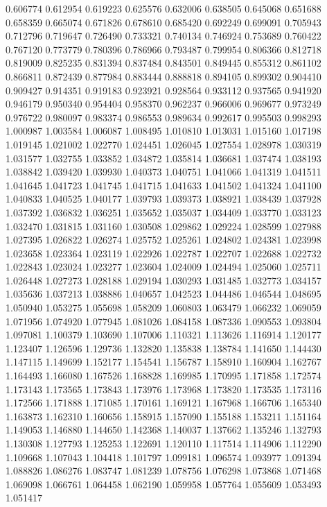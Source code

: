 0.606774
0.612954
0.619223
0.625576
0.632006
0.638505
0.645068
0.651688
0.658359
0.665074
0.671826
0.678610
0.685420
0.692249
0.699091
0.705943
0.712796
0.719647
0.726490
0.733321
0.740134
0.746924
0.753689
0.760422
0.767120
0.773779
0.780396
0.786966
0.793487
0.799954
0.806366
0.812718
0.819009
0.825235
0.831394
0.837484
0.843501
0.849445
0.855312
0.861102
0.866811
0.872439
0.877984
0.883444
0.888818
0.894105
0.899302
0.904410
0.909427
0.914351
0.919183
0.923921
0.928564
0.933112
0.937565
0.941920
0.946179
0.950340
0.954404
0.958370
0.962237
0.966006
0.969677
0.973249
0.976722
0.980097
0.983374
0.986553
0.989634
0.992617
0.995503
0.998293
1.000987
1.003584
1.006087
1.008495
1.010810
1.013031
1.015160
1.017198
1.019145
1.021002
1.022770
1.024451
1.026045
1.027554
1.028978
1.030319
1.031577
1.032755
1.033852
1.034872
1.035814
1.036681
1.037474
1.038193
1.038842
1.039420
1.039930
1.040373
1.040751
1.041066
1.041319
1.041511
1.041645
1.041723
1.041745
1.041715
1.041633
1.041502
1.041324
1.041100
1.040833
1.040525
1.040177
1.039793
1.039373
1.038921
1.038439
1.037928
1.037392
1.036832
1.036251
1.035652
1.035037
1.034409
1.033770
1.033123
1.032470
1.031815
1.031160
1.030508
1.029862
1.029224
1.028599
1.027988
1.027395
1.026822
1.026274
1.025752
1.025261
1.024802
1.024381
1.023998
1.023658
1.023364
1.023119
1.022926
1.022787
1.022707
1.022688
1.022732
1.022843
1.023024
1.023277
1.023604
1.024009
1.024494
1.025060
1.025711
1.026448
1.027273
1.028188
1.029194
1.030293
1.031485
1.032773
1.034157
1.035636
1.037213
1.038886
1.040657
1.042523
1.044486
1.046544
1.048695
1.050940
1.053275
1.055698
1.058209
1.060803
1.063479
1.066232
1.069059
1.071956
1.074920
1.077945
1.081026
1.084158
1.087336
1.090553
1.093804
1.097081
1.100379
1.103690
1.107006
1.110321
1.113626
1.116914
1.120177
1.123407
1.126596
1.129736
1.132820
1.135838
1.138784
1.141650
1.144430
1.147115
1.149699
1.152177
1.154541
1.156787
1.158910
1.160904
1.162767
1.164493
1.166080
1.167526
1.168828
1.169985
1.170995
1.171858
1.172574
1.173143
1.173565
1.173843
1.173976
1.173968
1.173820
1.173535
1.173116
1.172566
1.171888
1.171085
1.170161
1.169121
1.167968
1.166706
1.165340
1.163873
1.162310
1.160656
1.158915
1.157090
1.155188
1.153211
1.151164
1.149053
1.146880
1.144650
1.142368
1.140037
1.137662
1.135246
1.132793
1.130308
1.127793
1.125253
1.122691
1.120110
1.117514
1.114906
1.112290
1.109668
1.107043
1.104418
1.101797
1.099181
1.096574
1.093977
1.091394
1.088826
1.086276
1.083747
1.081239
1.078756
1.076298
1.073868
1.071468
1.069098
1.066761
1.064458
1.062190
1.059958
1.057764
1.055609
1.053493
1.051417
